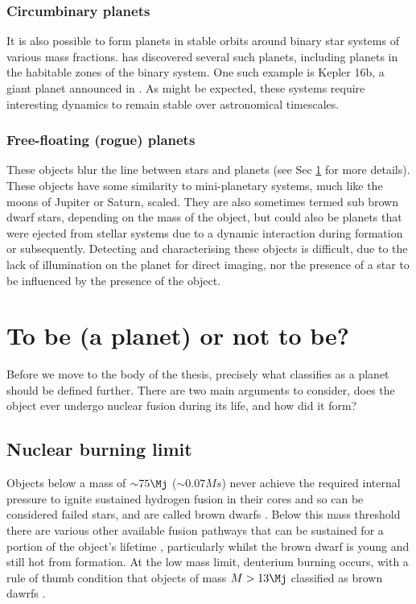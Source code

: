 \subsubsection{Circumbinary planets}
It is also possible to form planets in stable orbits around binary star systems of various mass fractions. \Kepler has discovered several such planets, including planets in the habitable zones of the binary system. One such example is Kepler 16b, a giant planet announced in \cite{kep16}. As might be expected, these systems require interesting dynamics to remain stable over astronomical timescales.

\subsubsection{Free-floating (rogue) planets}
These objects blur the line between stars and planets (see Sec \ref{sec:tobe} for more details). These objects have some similarity to mini-planetary systems, much like the moons of Jupiter or Saturn, scaled. They are also sometimes termed sub brown dwarf stars, depending on the mass of the object, but could also be planets that were ejected from stellar systems due to a dynamic interaction during formation or subsequently. Detecting and characterising these objects is difficult, due to the lack of illumination on the planet for direct imaging, nor the presence of a star to be influenced by the presence of the object. 

\section{To be (a planet) or not to be?}\label{sec:tobe}
Before we move to the body of the thesis, precisely what classifies as a planet should be defined further. There are two main arguments to consider, does the object ever undergo nuclear fusion during its life, and how did it form? 
\subsection{Nuclear burning limit}
Objects below a mass of ${\sim}75\Mj$ (${\sim}0.07Ms$) never achieve the required internal pressure to ignite sustained hydrogen fusion in their cores and so can be considered failed stars, and are called brown dwarfs \citep{1963Kumar}. Below this mass threshold there are various other available fusion pathways that can be sustained for a portion of the object's lifetime \citep{1997Kulkarni}, particularly whilst the brown dwarf is young and still hot from formation.  
At the low mass limit, deuterium burning occurs, with a rule of thumb condition that objects of mass $M>13\Mj$ classified as brown dawrfs \citep{2011Spiegel}.
